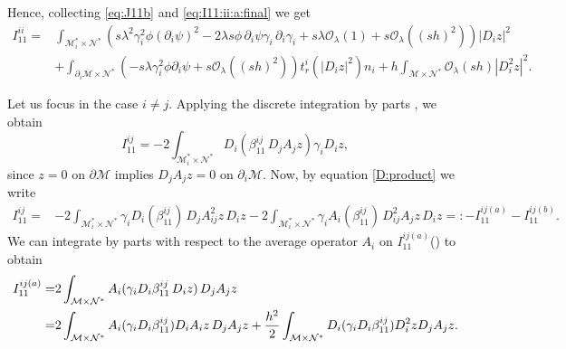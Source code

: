 \documentclass[11pt,oneside,leqno]{amsart}
\numberwithin{equation}{section}
\numberwithin{equation}{section}
\begin{document}
 Hence, collecting \eqref{eq:J11b} and \eqref{eq:I11:ii:a:final} we get
\begin{equation}
    \begin{aligned}
I_{11}^{ii}=&\int_{\mathcal{M}^{\ast}_{i}\times\mathcal{N}^{\ast}}\left(s\lambda^{2}\gamma_{i}^{2}\phi(\partial_{i}\psi)^{2}-2\lambda s
\phi\,\partial_{i}\psi\gamma_{i}\,\partial_{i}\gamma_{i}+s\lambda\mathcal{O}_{\lambda}(1)+s\mathcal{O}_{\lambda}((sh)^{2})\right)|D_{i}z|^{2}\\
&+\int_{\partial_{i}\mathcal{M}\times\mathcal{N}^{\ast}}(-    s\lambda\gamma_{i}^{2}\phi\partial_{i}\psi+s\mathcal{O}_{\lambda}((sh)^{2}))t_{r}^{i}(|D_{i}z|^{2})n_{i}+h\int_{\mathcal{M}\times\mathcal{N}^{\ast}}\mathcal{O}_{\lambda}(sh)|D_{i}^{2}z|^{2}.
\end{aligned}
\end{equation}
\par Let us focus in the case $i\ne j$. Applying the discrete integration by parts \cite[Lemma 2.2, equation (15)]{LDOP-2021}, we obtain 
\begin{equation*}  I_{11}^{ij}=-2\int_{\mathcal{M}_{i}^{\ast}\times\mathcal{N}^{\ast}}D_{i}( \beta_{11}^{ij}\,D_{j}A_{j}z)\gamma_{i}D_{i}z,
\end{equation*}
since $z=0$ on $\partial\mathcal{M}$ implies $D_{j}A_{j}z=0$ on $\partial_{i}\mathcal{M}$. Now, by equation \eqref{D:product} we write
\begin{equation}
\begin{split}
    I_{11}^{ij}=&-2\int_{\mathcal{M}_{i}^{\ast}\times\mathcal{N}^{\ast}}\gamma_{i}D_{i}( \beta_{11}^{ij})\,D_{j}A_{ij}^{2}z\,D_{i}z-2\int_{\mathcal{M}_{i}^{\ast}\times\mathcal{N}^{\ast}}\gamma_{i}A_{i}(\beta_{11}^{ij})\,D_{ij}^{2}A_{j}z\,D_{i}z=:-I_{11}^{ij(a)}-I_{11}^{ij(b)}.
    \end{split}
\end{equation}
We can integrate by parts with respect to the average operator $A_{i}$ on $I_{11}^{ij(a)}$(\cite[Lemma 2.2, equation (16)]{LDOP-2021}) to obtain
\begin{equation}\label{eq:non:diagonal:I_{11a}}
\begin{split}
    I_{11}^{ij(a)}=&2\int_{\mathcal{M}\times\mathcal{N}^{\ast}}A_{i}(\gamma_{i}D_{i} \beta_{11}^{ij}\,D_{i}z)\,D_{j}A_{j}z\\
    =&2\int_{\mathcal{M}\times\mathcal{N}^{\ast}}A_{i}(\gamma_{i}D_{i} \beta_{11}^{ij})D_{i}A_{i}z\,D_{j}A_{j}z+\frac{h^{2}}{2}\int_{\mathcal{M}\times\mathcal{N}^{\ast}}D_{i}(\gamma_{i}D_{i}\beta_{11}^{ij})D_{i}^{2}zD_{j}A_{j}z.
\end{split}
\end{equation}
\end{document}

